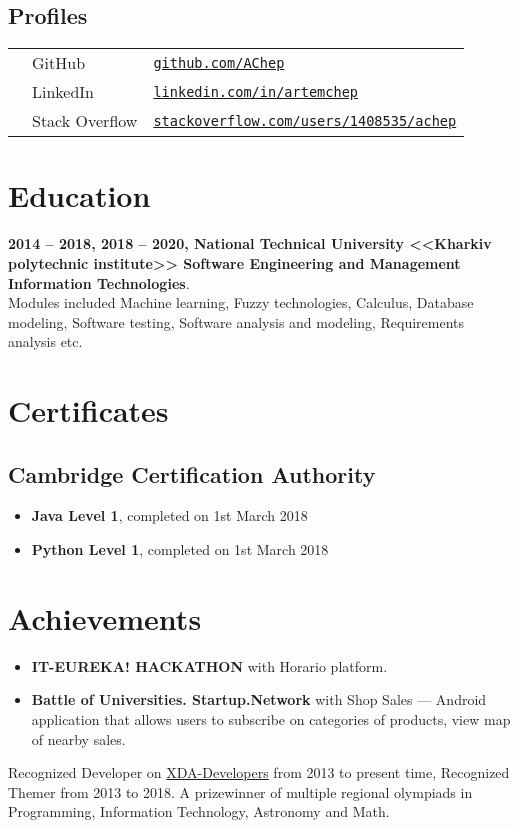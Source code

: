 \documentclass[a4paper]{article}
\begin{document}
	\subsection*{Profiles}
	\begin{tabular}{@{}lll}
		\faGithub & GitHub & \href{https://github.com/AChep}{\texttt{github.com/AChep}} \\
		\faLinkedin & LinkedIn & \href{https://www.linkedin.com/in/artemchep/}{\texttt{linkedin.com/in/artemchep}} \\
		\faStackOverflow & Stack Overflow & \href{https://stackoverflow.com/users/1408535/achep}{\texttt{stackoverflow.com/users/1408535/achep}} \\
	\end{tabular}

	\section*{Education}
	\textbf{2014 -- 2018, 2018 -- 2020, National Technical University <<Kharkiv polytechnic institute>> Software Engineering and Management Information Technologies}. \\
	Modules included Machine learning, Fuzzy technologies, Calculus, Database modeling, Software testing, Software analysis and modeling, Requirements analysis etc.
	
	\section*{Certificates}
	\subsection*{Cambridge Certification Authority}
	\begin{itemize}
		\item \textbf{Java Level 1}, completed on 1st March 2018
		\item \textbf{Python Level 1}, completed on 1st March 2018
	\end{itemize}

	\section*{Achievements}
	\begin{itemize}
		\item \textbf{IT-EUREKA! HACKATHON} with Horario platform.
		\item \textbf{Battle of Universities. Startup.Network} with Shop Sales --- Android application that allows users to subscribe on categories of products, view map of nearby sales.
	\end{itemize}
	Recognized Developer on \href{https://forum.xda-developers.com/member.php?u=3685328}{XDA-Developers} from 2013 to present time, Recognized Themer from 2013 to 2018.
	A prizewinner of multiple regional olympiads in Programming, Information Technology, Astronomy and Math.
\end{document}

